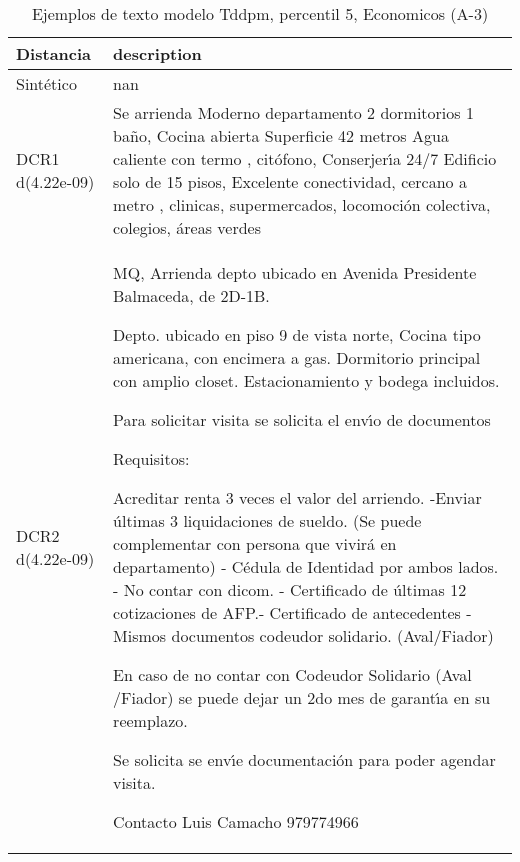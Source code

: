 \begin{table}[H]
\centering
\fontsize{10}{14}\selectfont
\caption{Ejemplos de texto modelo Tddpm, percentil 5, Economicos (A-3)}
\label{table-example-economicos-a-3-tddpm_mlp-5p-text}
\begin{tabular}{|l|m{35em}|}
\hline
\rowcolor[gray]{0.8}
Distancia & description \\
\hline Sintético & nan \\
\hline DCR1 d(4.22e-09) & Se arrienda Moderno departamento  2 dormitorios 1 ba\~no, Cocina abierta Superficie 42 metros Agua caliente con termo , cit\'ofono, Conserjer{\'\i}a 24/7 Edificio solo de 15 pisos, Excelente conectividad, cercano a metro , clinicas, supermercados, locomoci\'on colectiva, colegios, \'areas verdes \\
\hline DCR2 d(4.22e-09) & MQ, Arrienda depto ubicado en Avenida Presidente Balmaceda, de 2D-1B.

Depto. ubicado en piso 9 de vista norte,
Cocina tipo americana, con encimera a gas.
Dormitorio principal con amplio closet.
Estacionamiento y bodega incluidos.

Para solicitar visita se solicita el env{\'\i}o de documentos

Requisitos:

Acreditar renta 3 veces el valor del arriendo. 
-Enviar \'ultimas 3 liquidaciones de sueldo. (Se puede complementar con persona que vivir\'a en departamento)
- C\'edula de Identidad por ambos lados.
- No contar con dicom.
- Certificado de \'ultimas 12 cotizaciones de AFP.- Certificado de antecedentes
- Mismos documentos codeudor solidario. (Aval/Fiador)

En caso de no contar con Codeudor Solidario (Aval /Fiador) se puede dejar un 2do mes de garant{\'\i}a en su reemplazo.

Se solicita se env{\'\i}e documentaci\'on para poder agendar visita.


Contacto
Luis Camacho
979774966 \\
\hline
\end{tabular}
\end{table}
